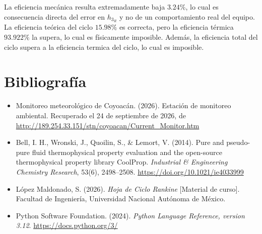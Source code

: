 \documentclass[12pt,letterpaper]{article}
\begin{document}
La eficiencia mecánica resulta extremadamente baja $3.24\%$, lo cual es consecuencia directa del error en $h_{3_R}$ y no de un
comportamiento real del equipo. La eficiencia teórica del ciclo $15.98\%$ es correcta,
pero la eficiencia térmica $93.922\%$ la supera, lo cual es físicamente imposible. 
Además, la eficiencia total del ciclo supera a la eficiencia termica del ciclo, lo cual es imposible.\linebreak


\section{Bibliografía}

\begin{itemize}
    \item Monitoreo meteorológico de Coyoacán. (2026). Estación de monitoreo ambiental.
    Recuperado el 24 de septiembre de 2026, de 
    \url{http://189.254.33.151/stn/coyoacan/Current_Monitor.htm}

    \item Bell, I. H., Wronski, J., Quoilin, S., \& Lemort, V. (2014). 
    Pure and pseudo-pure fluid thermophysical property evaluation and 
    the open-source thermophysical property library CoolProp. 
    \textit{Industrial \& Engineering Chemistry Research}, 53(6), 
    2498--2508. \url{https://doi.org/10.1021/ie4033999}

    \item López Maldonado, S. (2026). \textit{Hoja de Ciclo Rankine} [Material de curso]. 
    Facultad de Ingeniería, Universidad Nacional Autónoma de México.
    
    \item Python Software Foundation. (2024). \textit{Python Language 
    Reference, version 3.12}. \url{https://docs.python.org/3/}
\end{itemize}
\end{document}
